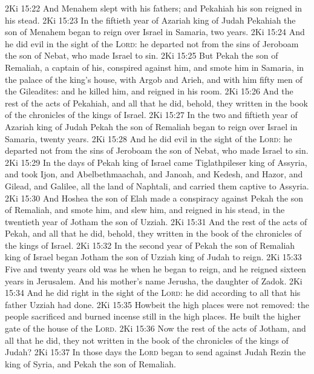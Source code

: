 \vs 2Ki 15:22 And Menahem slept with his fathers; and Pekahiah his son reigned in his stead.
\vs 2Ki 15:23 In the fiftieth year of Azariah king of Judah Pekahiah the son of Menahem began to reign over Israel in Samaria,  two years.
\vs 2Ki 15:24 And he did  evil in the sight of the \textsc{Lord}: he departed not from the sins of Jeroboam the son of Nebat, who made Israel to sin.
\vs 2Ki 15:25 But Pekah the son of Remaliah, a captain of his, conspired against him, and smote him in Samaria, in the palace of the king's house, with Argob and Arieh, and with him fifty men of the Gileadites: and he killed him, and reigned in his room.
\vs 2Ki 15:26 And the rest of the acts of Pekahiah, and all that he did, behold, they  written in the book of the chronicles of the kings of Israel.
\vs 2Ki 15:27 In the two and fiftieth year of Azariah king of Judah Pekah the son of Remaliah began to reign over Israel in Samaria,  twenty years.
\vs 2Ki 15:28 And he did  evil in the sight of the \textsc{Lord}: he departed not from the sins of Jeroboam the son of Nebat, who made Israel to sin.
\vs 2Ki 15:29 In the days of Pekah king of Israel came Tiglathpileser king of Assyria, and took Ijon, and Abelbethmaachah, and Janoah, and Kedesh, and Hazor, and Gilead, and Galilee, all the land of Naphtali, and carried them captive to Assyria.
\vs 2Ki 15:30 And Hoshea the son of Elah made a conspiracy against Pekah the son of Remaliah, and smote him, and slew him, and reigned in his stead, in the twentieth year of Jotham the son of Uzziah.
\vs 2Ki 15:31 And the rest of the acts of Pekah, and all that he did, behold, they  written in the book of the chronicles of the kings of Israel.
\vs 2Ki 15:32 In the second year of Pekah the son of Remaliah king of Israel began Jotham the son of Uzziah king of Judah to reign.
\vs 2Ki 15:33 Five and twenty years old was he when he began to reign, and he reigned sixteen years in Jerusalem. And his mother's name  Jerusha, the daughter of Zadok.
\vs 2Ki 15:34 And he did  right in the sight of the \textsc{Lord}: he did according to all that his father Uzziah had done.
\vs 2Ki 15:35 Howbeit the high places were not removed: the people sacrificed and burned incense still in the high places. He built the higher gate of the house of the \textsc{Lord}.
\vs 2Ki 15:36 Now the rest of the acts of Jotham, and all that he did,  they not written in the book of the chronicles of the kings of Judah?
\vs 2Ki 15:37 In those days the \textsc{Lord} began to send against Judah Rezin the king of Syria, and Pekah the son of Remaliah.
